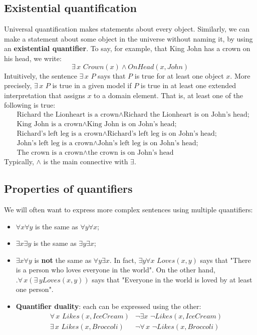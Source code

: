 \subsection{Existential quantification}
Universal quantification makes statements about every object. Similarly, we can make a statement about some object in the universe without naming it, by using an \textbf{existential quantifier}.\newline\newline
To say, for example, that King John has a crown on his head, we write:
\[\exists\, x\,\,  Crown(x) \land OnHead(x, John)\]
Intuitively, the sentence $\exists\, x\,\, P$ says that $P$ is true for at least one object $x$. More precisely, $\exists \,x \,\, P$ is true in a given model if $P$ is true in at least one extended interpretation that assigns $x$ to a domain element. That is, at least one of the following is true:
\[
\begin{split}
    & \text{Richard the Lionheart is a crown} \land \text{Richard the Lionheart is on John’s head;}\\
    & \text{King John is a crown} \land \text{King John is on John’s head;}\\
    & \text{Richard’s left leg is a crown} \land \text{Richard’s left leg is on John’s head;}\\
    & \text{John’s left leg is a crown} \land \text{John’s left leg is on John’s head;}\\
    & \text{The crown is a crown} \land \text{the crown is on John’s head}
\end{split}
\]
Typically, $\land$ is the main connective with $\exists$.

\subsection{Properties of quantifiers}
We will often want to express more complex sentences using multiple quantifiers:
\begin{itemize}
    \item $\forall x \forall y$ is the same as $\forall y \forall x$;

    \item $\exists x \exists y$ is the same as $\exists y \exists x$;

    \item $\exists x \forall y$ is \textbf{not} the same as $\forall y \exists x$. In fact, $\exists y\forall x \,\,Loves(x, y)$ says that "There is a person who loves everyone in the world". On the other hand, $. \forall\,x (\exists\,y Loves(x, y))$ says that "Everyone in the world is loved by at least one person".

    \item \textbf{Quantifier duality}: each can be expressed using the other:
    \[
    \begin{split}
        \forall\, x \,\, Likes(x,IceCream) & \neg \exists x \,\, \neg Likes(x,IceCream)\\
        \exists \, x \,\, Likes(x, Broccoli) & \neg \forall \, x \,\, \neg Likes(x, Broccoli)
    \end{split}\]
\end{itemize}

